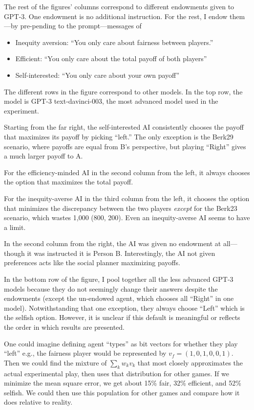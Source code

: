 \documentclass[11pt]{article}
\begin{document}
The rest of the figures' columns correspond to different endowments given to GPT-3.
One endowment is no additional instruction.
For the rest, I endow them---by pre-pending to the prompt---messages of 
\begin{itemize}
    \item Inequity aversion: ``You only care about fairness between players.''
    \item Efficient: ``You only care about the total payoff of both players''
    \item Self-interested: ``You only care about your own payoff''
\end{itemize}

The different rows in the figure correspond to other models. 
In the top row, the model is GPT-3 text-davinci-003, the most advanced model used in the experiment.  

Starting from the far right, the self-interested AI consistently chooses the payoff that maximizes its payoff by picking ``left.''
The only exception is the Berk29 scenario, where payoffs are equal from B's perspective, but playing ``Right'' gives a much larger payoff to A. 

For the efficiency-minded AI in the second column from the left, it always chooses the option that maximizes the total payoff.

For the inequity-averse AI in the third column from the left, it chooses the option that minimizes the discrepancy between the two players \emph{except} for the Berk23 scenario, which wastes 1,000 (800, 200).
Even an inequity-averse AI seems to have a limit.

In the second column from the right, the AI was given no endowment at all---though it was instructed it is Person B.
Interestingly, the AI not given preferences acts like the social planner maximizing payoffs.

In the bottom row of the figure, I pool together all the less advanced GPT-3 models because they do not seemingly change their answers despite the endowments (except the un-endowed agent, which chooses all ``Right'' in one model).
Notwithstanding that one exception, they always choose ``Left'' which is the selfish option.
However, it is unclear if this default is meaningful or reflects the order in which results are presented. 

One could imagine defining agent ``types'' as bit vectors for whether they play ``left'' e.g., the fairness player would be represented by $v_f = (1,0,1,0,0,1)$.
Then we could find the mixture of $\sum_k w_k v_k$ that most closely approximates the actual experimental play, then uses that distribution for other games.  
If we minimize the mean square error, we get about 15\% fair, 32\% efficient, and 52\% selfish.
We could then use this population for other games and compare how it does relative to reality.
\end{document}
